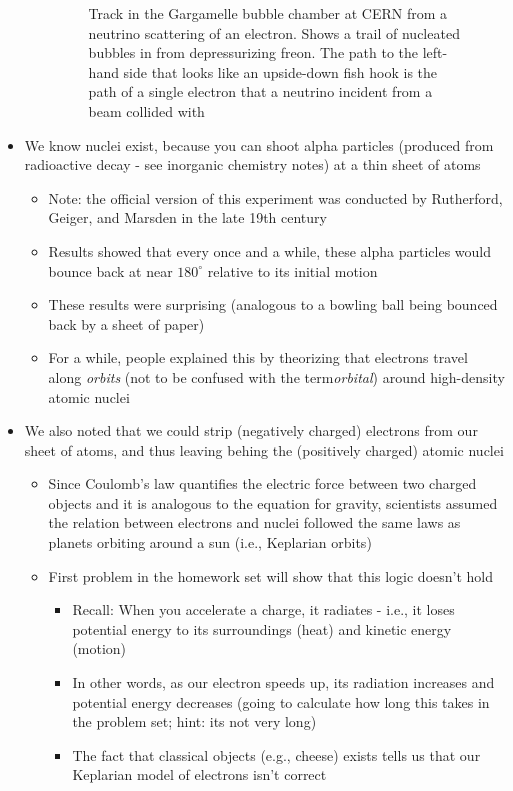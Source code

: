 \documentclass[a4paper]{article}
\begin{document}
\begin{itemize}
\begin{itemize}
\begin{figure}
                \caption{Track in the Gargamelle bubble chamber at CERN from a neutrino scattering of an electron. Shows a trail of nucleated bubbles in from depressurizing freon. The path to the left-hand side that looks like an upside-down fish hook is the path of a single electron that a neutrino incident from a beam collided with}
                \label{fig:pathspacetrans}
            \end{figure}
        \end{itemize}
    \item We know nuclei exist, because you can shoot alpha particles (produced from radioactive decay - see inorganic chemistry notes) at a thin sheet of atoms
        \begin{itemize}
            \item Note: the official version of this experiment was conducted by Rutherford, Geiger, and Marsden in the late 19th century
            \item Results showed that every once and a while, these alpha particles would bounce back at near $180^\circ$ relative to its initial motion
            \item These results were surprising (analogous to a bowling ball being bounced back by a sheet of paper) 
            \item For a while, people explained this by theorizing that electrons travel along \textit{orbits} (not to be confused with the term\textit{orbital}) around high-density atomic nuclei
        \end{itemize}
    \item We also noted that we could strip (negatively charged) electrons from our sheet of atoms, and thus leaving behing the (positively charged) atomic nuclei
        \begin{itemize}
            \item Since Coulomb's law quantifies the electric force between two charged objects and it is analogous to the equation for gravity, scientists assumed the relation between electrons and nuclei followed the same laws as planets orbiting around a sun (i.e., Keplarian orbits) 
            \item First problem in the homework set will show that this logic doesn't hold
                \begin{itemize}
                    \item Recall: When you accelerate a charge, it radiates - i.e., it loses potential energy to its surroundings (heat) and kinetic energy (motion)
                    \item In other words, as our electron speeds up, its radiation increases and potential energy decreases (going to calculate how long this takes in the problem set; hint: its not very long) 
                    \item The fact that classical objects (e.g., cheese) exists tells us that our Keplarian model of electrons isn't correct
                \end{itemize}
        \end{itemize}
\end{itemize}
\end{document}
